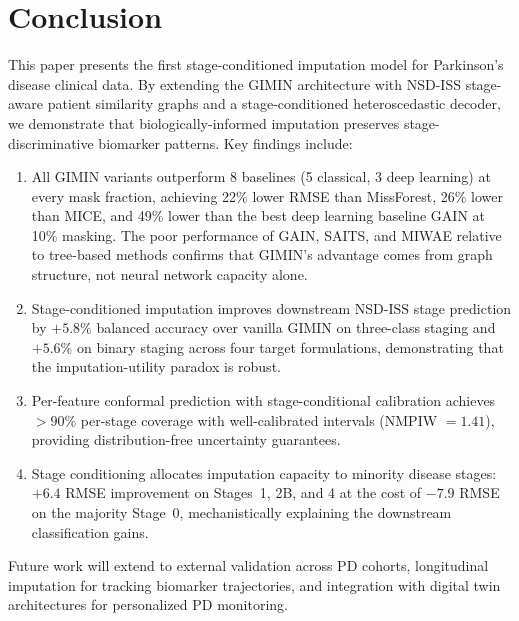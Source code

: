 \section{Conclusion}
\label{p2:sec:conclusion}

This paper presents the first stage-conditioned imputation model for Parkinson's disease clinical data. By extending the GIMIN architecture with NSD-ISS stage-aware patient similarity graphs and a stage-conditioned heteroscedastic decoder, we demonstrate that biologically-informed imputation preserves stage-discriminative biomarker patterns. Key findings include:

\begin{enumerate}
    \item All GIMIN variants outperform 8 baselines (5 classical, 3 deep learning) at every mask fraction, achieving 22\% lower RMSE than MissForest, 26\% lower than MICE, and 49\% lower than the best deep learning baseline GAIN at 10\% masking. The poor performance of GAIN, SAITS, and MIWAE relative to tree-based methods confirms that GIMIN's advantage comes from graph structure, not neural network capacity alone.
    \item Stage-conditioned imputation improves downstream NSD-ISS stage prediction by $+5.8\%$ balanced accuracy over vanilla GIMIN on three-class staging and $+5.6\%$ on binary staging across four target formulations, demonstrating that the imputation-utility paradox is robust.
    \item Per-feature conformal prediction with stage-conditional calibration achieves ${>}90\%$ per-stage coverage with well-calibrated intervals (NMPIW $= 1.41$), providing distribution-free uncertainty guarantees.
    \item Stage conditioning allocates imputation capacity to minority disease stages: $+6.4$ RMSE improvement on Stages~1, 2B, and 4 at the cost of $-7.9$ RMSE on the majority Stage~0, mechanistically explaining the downstream classification gains.
\end{enumerate}

Future work will extend to external validation across PD cohorts, longitudinal imputation for tracking biomarker trajectories, and integration with digital twin architectures for personalized PD monitoring.
